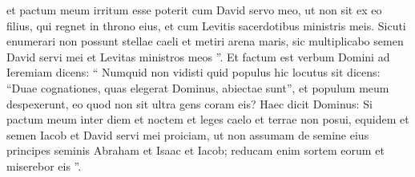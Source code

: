 \begin{biblechapter}
\begin{biblechapter}
\begin{biblechapter}
\begin{biblechapter}
\begin{biblechapter}
\begin{biblechapter}
\begin{biblechapter}
\begin{biblechapter}
\begin{biblechapter}
\begin{biblechapter}
\begin{biblechapter}
\begin{biblechapter}
\begin{biblechapter}
\begin{biblechapter}
\begin{biblechapter}
\begin{biblechapter}
\begin{biblechapter}
\begin{biblechapter}
\begin{biblechapter}
\begin{biblechapter}
\begin{biblechapter}
\begin{biblechapter}
\begin{biblechapter}
\begin{biblechapter}
\begin{biblechapter}
\begin{biblechapter}
\begin{biblechapter}
\begin{biblechapter}
\begin{biblechapter}
\begin{biblechapter}
\begin{biblechapter}
\begin{biblechapter}
\begin{biblechapter}
\verse et pactum meum irritum esse poterit cum David servo meo, ut non sit ex eo filius, qui regnet in throno eius, et cum Levitis sacerdotibus ministris meis. 
\verse Sicuti enumerari non possunt stellae caeli et metiri arena maris, sic multiplicabo semen David servi mei et Levitas ministros meos ”.
 \verse Et factum est verbum Domini ad Ieremiam dicens: 
\verse “ Numquid non vidisti quid populus hic locutus sit dicens: “Duae cognationes, quas elegerat Dominus, abiectae sunt”, et populum meum despexerunt, eo quod non sit ultra gens coram eis? 
\verse Haec dicit Dominus: Si pactum meum inter diem et noctem et leges caelo et terrae non posui, 
\verse equidem et semen Iacob et David servi mei proiciam, ut non assumam de semine eius principes seminis Abraham et Isaac et Iacob; reducam enim sortem eorum et miserebor eis ”.
 

\end{biblechapter}
\end{biblechapter}
\end{biblechapter}
\end{biblechapter}
\end{biblechapter}
\end{biblechapter}
\end{biblechapter}
\end{biblechapter}
\end{biblechapter}
\end{biblechapter}
\end{biblechapter}
\end{biblechapter}
\end{biblechapter}
\end{biblechapter}
\end{biblechapter}
\end{biblechapter}
\end{biblechapter}
\end{biblechapter}
\end{biblechapter}
\end{biblechapter}
\end{biblechapter}
\end{biblechapter}
\end{biblechapter}
\end{biblechapter}
\end{biblechapter}
\end{biblechapter}
\end{biblechapter}
\end{biblechapter}
\end{biblechapter}
\end{biblechapter}
\end{biblechapter}
\end{biblechapter}
\end{biblechapter}
